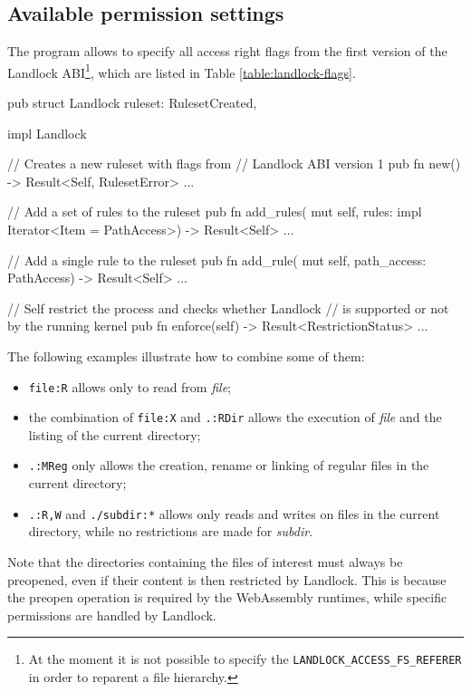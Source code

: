 \subsection{Available permission settings}

The program allows to specify all access right flags from the first version of the Landlock
ABI\footnote{At the moment it is not possible to specify the \texttt{LANDLOCK\_ACCESS\_FS\_REFERER} in order to reparent a file hierarchy.},
which are listed in Table \ref{table:landlock-flags}.

\begin{code}[language=Rust, caption=The outline of the \texttt{landlock} module., label=lst:rust-landlock]
pub struct Landlock {
  ruleset: RulesetCreated,
}

impl Landlock {
  // Creates a new ruleset with flags from
  // Landlock ABI version 1
  pub fn new() -> Result<Self, RulesetError> {...}

  // Add a set of rules to the ruleset
  pub fn add_rules(
    mut self,
    rules: impl Iterator<Item = PathAccess>)
    -> Result<Self>
  {...}

  // Add a single rule to the ruleset
  pub fn add_rule(
    mut self,
    path_access: PathAccess) -> Result<Self>
  {...}

  // Self restrict the process and checks whether Landlock
  // is supported or not by the running kernel
  pub fn enforce(self) -> Result<RestrictionStatus>
  {...}
}
\end{code}

The following examples illustrate how to combine some of them:
\begin{itemize}
  \item \texttt{file:R} allows only to read from \textit{file};
  \item the combination of \texttt{file:X} and \texttt{.:RDir} allows the execution of \textit{file} and the listing of the current directory;
  \item \texttt{.:MReg} only allows the creation, rename or linking of regular files in the current directory;
  \item \texttt{.:R,W} and \texttt{./subdir:*} allows only reads and writes on files in the current directory, while no restrictions are
        made for \textit{subdir}.
\end{itemize}

Note that the directories containing the files of interest must always be preopened,
even if their content is then restricted by Landlock. This is because the preopen operation
is required by the WebAssembly runtimes, while specific permissions are handled by Landlock.


